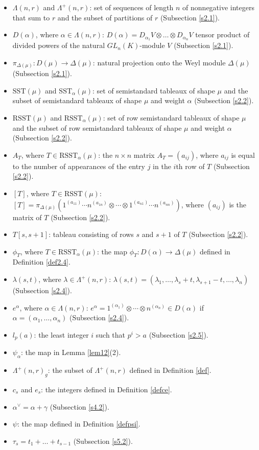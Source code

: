 \documentclass[ALCO,Unicode]{cedram}
\newcommand{\al}{\alpha}
\newcommand{\La}{\Lambda}
\numberwithin{equation}{section}
\begin{document}
{\small \begin{itemize}
	
 \item $\Lambda(n,r)$ and $\Lambda^+(n,r)$: set of sequences of length $n$ of nonnegative integers that sum to $r$ and the subset of partitions of $r$ (Subsection \ref{s2.1}).
	\item $D(\al)$, where $\alpha \in \Lambda(n,r)$: $D(\al)=D_{\al_1}V\otimes \dots \otimes D_{\al_n}V$ tensor product of divided powers of the natural $GL_n(K)$-module $V$ (Subsection \ref{s2.1}).
	\item $\pi_{\Delta(\mu)}:D(\mu) \to \Delta(\mu)$: natural projection onto the Weyl module $\Delta(\mu)$ (Subsection \ref{s2.1}).
	\item $\mathrm{SST}(\mu)$ and $\mathrm{SST}_{\alpha}(\mu)$: set of semistandard tableaux of shape $\mu$ and the subset of semistandard tableaux of shape $\mu$ and weight $\alpha$ (Subsection \ref{s2.2}).
	\item $\mathrm{RSST}(\mu)$ and $\mathrm{RSST}_{\alpha}(\mu)$: set of row semistandard tableaux of shape $\mu$ and the subset of row semistandard tableaux of shape $\mu$ and weight $\alpha$ (Subsection \ref{s2.2}).
	\item $A_T$, where $T \in \mathrm{RSST}_{\alpha}(\mu)$: the $n \times n$ matrix $A_T=(a_{ij})$, where $a_{ij}$ is equal to the number of appearances of the entry $j$ in the $i$th row of $T$ (Subsection \ref{s2.2}).
	\item $[T]$, where $ T \in \mathrm{RSST}(\mu)$: $[T]=\pi_{\Delta(\mu)}(1^{(a_{11})} \cdots n^{(a_{1n})} \otimes \cdots \otimes 1^{(a_{n1})} \cdots n^{(a_{nn})})$, where $(a_{ij})$ is the matrix of $T$ (Subsection \ref{s2.2}). 
	\item $T[s,s+1]$: tableau consisting of rows $s$ and $s+1$ of $T$ (Subsection \ref{s2.2}).
	\item $\phi_T$, where $T \in \mathrm{RSST}_{\alpha}(\mu)$: the map $\phi_T: D(\alpha) \to \Delta(\mu)$ defined in Definition \ref{def2.4}.
	\item $\lambda({s,t})$, where $\lambda \in \Lambda^+(n,r)$: $\lambda({s,t})=(\lambda_1, \dots, \lambda_s+t, \lambda_{s+1}-t,\dots, \lambda_n)$ (Subsection \ref{s2.4}).
	\item $e^{\al}$, where $\alpha \in \Lambda(n,r)$: $e^{\al} =1^{(\al_1)} \otimes \cdots \otimes n^{(\al_n)} \in D(\al)$ if $\alpha =(\alpha_1, \dots, \alpha_n)$ (Subsection \ref{s2.4}).

	\item  $l_p(a)$: the least integer $i$ such that $p^i>a$ (Subsection \ref{s2.5}).
	\item $\psi_\alpha$: the map in Lemma \ref{lem12}(2).
	\item $\La^{+}(n,r)_g$: the subset of $\Lambda^+(n,r)$ defined in Definition \ref{def}.
	\item $c_s$ and $e_s$: the integers defined in Definition \ref{defce}.
	\item $\al^{\vee} =\al+\gamma$ (Subsection \ref{s4.2}).
	\item $\psi$: the map defined in Definition \ref{defpsi}.
	\item $\tau_s=t_1 + \dots +t_{s-1}$ (Subsection \ref{s5.2}).
\end{itemize}}
\end{document}
